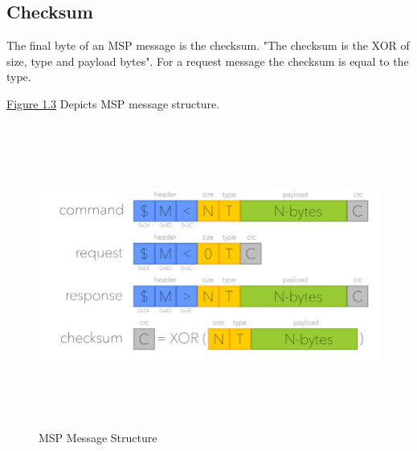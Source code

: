 \subsection{Checksum}
The final byte of an MSP message is the checksum. "The checksum is the XOR of size, type and payload bytes". For a request message the checksum is equal to the type.

\hyperref[fig:msp]{Figure 1.3} Depicts MSP message structure. 
 \begin{figure}[H]
\includegraphics[width=15cm,height=10cm]{images/3.jpg}
\caption{MSP Message Structure }
\label{fig:msp}
\end{figure}



